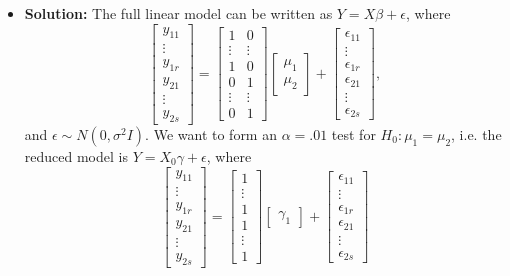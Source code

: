 \documentclass[11pt]{article}
\begin{document}
\begin{itemize}
\item[] {\bf Solution:}  The full linear model can be written as $Y=X\beta + \epsilon$, where
\[
\begin{bmatrix}
y_{11} \\ \vdots \\ y_{1r} \\ y_{21} \\ \vdots \\ y_{2s}
\end{bmatrix} = \begin{bmatrix}
1 & 0 \\
\vdots & \vdots \\
1 & 0 \\
0 & 1 \\
\vdots & \vdots \\
0 & 1
\end{bmatrix} \begin{bmatrix}
\mu_1 \\ \mu_2
\end{bmatrix} + \begin{bmatrix}
\epsilon_{11} \\ \vdots \\ \epsilon_{1r} \\ \epsilon_{21} \\ \vdots \\ \epsilon_{2s}
\end{bmatrix},
\]
and $\epsilon \sim N(0,\sigma^2I)$.  We want to form an $\alpha = .01$ test for $H_0\colon \mu_1 = \mu_2$, i.e. the reduced model is $Y = X_0\gamma + \epsilon$, where
\[
\begin{bmatrix}
y_{11} \\ \vdots \\ y_{1r} \\ y_{21} \\ \vdots \\ y_{2s}
\end{bmatrix} = \begin{bmatrix}
1 \\ \vdots \\ 1 \\ 1 \\\vdots \\ 1
\end{bmatrix}\begin{bmatrix}
\gamma_1
\end{bmatrix} + \begin{bmatrix}
\epsilon_{11} \\ \vdots \\ \epsilon_{1r} \\ \epsilon_{21} \\ \vdots \\ \epsilon_{2s}

\end{bmatrix}\]
\end{itemize}
\end{document}
